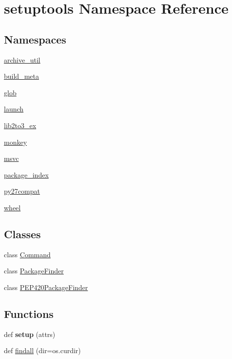 \hypertarget{namespacesetuptools}{}\section{setuptools Namespace Reference}
\label{namespacesetuptools}
\subsection*{Namespaces}
\begin{DoxyCompactItemize}
\item 
 \hyperlink{namespacesetuptools_1_1archive__util}{archive\+\_\+util}
\item 
 \hyperlink{namespacesetuptools_1_1build__meta}{build\+\_\+meta}
\item 
 \hyperlink{namespacesetuptools_1_1glob}{glob}
\item 
 \hyperlink{namespacesetuptools_1_1launch}{launch}
\item 
 \hyperlink{namespacesetuptools_1_1lib2to3__ex}{lib2to3\+\_\+ex}
\item 
 \hyperlink{namespacesetuptools_1_1monkey}{monkey}
\item 
 \hyperlink{namespacesetuptools_1_1msvc}{msvc}
\item 
 \hyperlink{namespacesetuptools_1_1package__index}{package\+\_\+index}
\item 
 \hyperlink{namespacesetuptools_1_1py27compat}{py27compat}
\item 
 \hyperlink{namespacesetuptools_1_1wheel}{wheel}
\end{DoxyCompactItemize}
\subsection*{Classes}
\begin{DoxyCompactItemize}
\item 
class \hyperlink{classsetuptools_1_1_command}{Command}
\item 
class \hyperlink{classsetuptools_1_1_package_finder}{Package\+Finder}
\item 
class \hyperlink{classsetuptools_1_1_p_e_p420_package_finder}{P\+E\+P420\+Package\+Finder}
\end{DoxyCompactItemize}
\subsection*{Functions}
\begin{DoxyCompactItemize}
\item 
\mbox{\label{namespacesetuptools_ad048bb82cb20bf61541da45950f1f4cb}} 
def {\bfseries setup} (attrs)
\item 
def \hyperlink{namespacesetuptools_a9d3e6b5f82f1d22fb1d7ad0daf6018f6}{findall} (dir=os.\+curdir)
\end{DoxyCompactItemize}
